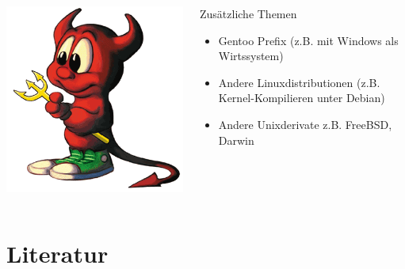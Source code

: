 \documentclass[utf8]{beamer}
\begin{document}
\begin{frame}
\begin{columns}
\vspace{-10pt}
\begin{center}\includegraphics[scale=0.2]{media/freebsd-logo.png}\end{center}
\vspace{-10pt}
\begin{block}{Zusätzliche Themen}
  \begin{itemize}
      \item Gentoo Prefix (z.B. mit Windows als Wirtssystem)
      \item Andere Linuxdistributionen (z.B. Kernel-Kompilieren unter Debian)
      \item Andere Unixderivate z.B. FreeBSD, Darwin
  \end{itemize}
\end{block}
\end{columns}

\end{frame}

\section{Literatur}
\end{document}
